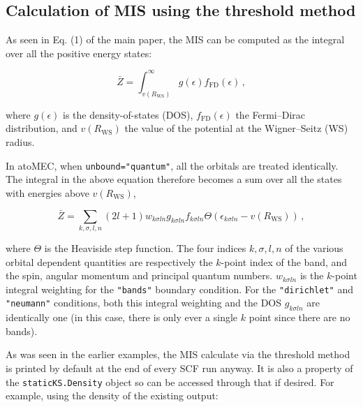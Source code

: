 \documentclass[11pt]{article}
\begin{document}
\hypertarget{calculation-of-mis-using-the-threshold-method}{%
\subsection{Calculation of MIS using the threshold
method}\label{calculation-of-mis-using-the-threshold-method}}

As seen in Eq. (1) of the main paper, the MIS can be computed as the
integral over all the positive energy states:

\begin{equation}
\bar{Z} = \int_{v(R_\textrm{WS})}^\infty g(\epsilon) f_\textrm{FD}(\epsilon)\,,
\end{equation}

where \(g(\epsilon)\) is the density-of-states (DOS),
\(f_\textrm{FD}(\epsilon)\) the Fermi--Dirac distribution, and
\(v(R_\textrm{WS})\) the value of the potential at the Wigner--Seitz
(WS) radius.

In atoMEC, when \texttt{unbound="quantum"}, all the orbitals are treated
identically. The integral in the above equation therefore becomes a sum
over all the states with energies above \(v(R_\textrm{WS})\),

\begin{equation}
\bar{Z} = \sum_{k,\sigma,l,n} (2l+1) w_{k\sigma ln} g_{k\sigma ln} f_{k\sigma ln} \Theta(\epsilon_{k\sigma ln}-v(R_\textrm{WS}))\,,
\end{equation}

where \(\Theta\) is the Heaviside step function. The four indices
\(k,\sigma,l,n\) of the various orbital dependent quantities are
respectively the \(k\)-point index of the band, and the spin, angular
momentum and principal quantum numbers. \(w_{k\sigma ln}\) is the
\(k\)-point integral weighting for the \texttt{"bands"} boundary
condition. For the \texttt{"dirichlet"} and \texttt{"neumann"}
conditions, both this integral weighting and the DOS \(g_{k\sigma ln}\)
are identically one (in this case, there is only ever a single \(k\)
point since there are no bands).

As was seen in the earlier examples, the MIS calculate via the threshold
method is printed by default at the end of every SCF run anyway. It is
also a property of the \texttt{staticKS.Density} object so can be
accessed through that if desired. For example, using the density of the
existing output:
\end{document}
